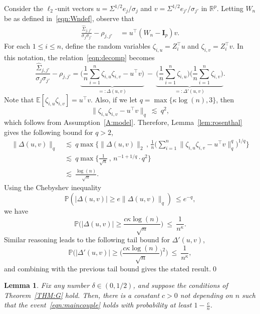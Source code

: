 \documentclass[aos,preprint]{imsart}
\numberwithin{equation}{section}
\theoremstyle{plain}
\newtheorem{lemma}{Lemma}[section]
\newcommand{\R}{\mathbb{R}}
\renewcommand{\hat}[1]{\widehat{#1}}
\renewcommand{\P}{\mathbb{P}}
\newcommand{\E}{\mathbb{E}}
\newcommand{\ttop}{^{\top}}
\newcommand{\ts}{\textstyle}
\newcommand{\1}{{\bf{1}}}
\newcommand{\0}{\mathbf{0}}
\begin{document}
\proof
 Consider the $\ell_2$-unit vectors $u=\Sigma^{1/2}e_j/\sigma_j$ and $v=\Sigma^{1/2}e_{j'}/\sigma_{j'}$  in $\R^p$.
Letting $W_n$ be as defined in~\eqref{eqn:Wndef}, observe that
\begin{equation}\label{eqn:decomp}
\begin{split}
\frac{\hat \Sigma_{j,j'}}{\sigma_j\sigma_{j'}} -\rho_{j,j'}
 & \ = u\ttop (W_n-\mathbf{I}_p)v.
%
%
\end{split}
\end{equation}
For each $1\leq i\leq n$, define the random variables $\zeta_{i,u}=Z_i\ttop u$ and $\zeta_{i,v}=Z_i\ttop v$. In this notation, the relation~\eqref{eqn:decomp} becomes
\begin{equation*}
\frac{\hat \Sigma_{j,j'}}{\sigma_j\sigma_{j'}} -\rho_{j,j'} =\underbrace{\Big(\ts\frac 1n \sum_{i=1}^n \zeta_{i,u}\zeta_{i,v}- u\ttop v\Big)}_{=:\Delta(u,v)} \ - \ \underbrace{\Big(\ts\frac 1n \sum_{i=1}^n \zeta_{i,u}\Big)\Big(\ts\frac 1n \sum_{i=1}^n \zeta_{i,v}\Big)}_{=:\Delta'(u,v)}.
\end{equation*}
Note that $\E[\zeta_{i,u}\zeta_{i,v}]=u\ttop v$.  Also, if we let $q=\max\{\kappa\log(n),3\}$, then
$$\|\zeta_{i,u}\zeta_{i,v}-u\ttop v\|_q \ \lesssim \ q^2,$$
which follows from Assumption~\ref{A:model}. Therefore, Lemma~\eqref{lem:rosenthal} gives the following bound for $q>2$,
\begin{equation}
\begin{split}
\|\Delta(u,v)\|_q & \ \lesssim  \ q \max\Big\{ \|\Delta(u,v)\|_2 \, , \, \ts\frac{1}{n}\big(\sum_{i=1}^n \|\zeta_{i,u}\zeta_{i,v}-u\ttop v\|_q^q\big)^{1/q}\Big\}\\[0.3cm]
%
& \ \lesssim \ q \max\Big\{\ts\frac{1}{\sqrt n} \, , \,  n^{-1+1/q}\cdot q^2\Big\}\\[0.3cm]
%
& \ \lesssim \ \ts\frac{\log(n)}{\sqrt n}.
\end{split}
\end{equation}
Using the Chebyshev inequality 
$$\P(|\Delta(u,v)|\geq e \|\Delta(u,v)\|_q) \ \leq e^{-q},$$
 we have
 $$\P\Big(|\Delta(u,v)|\geq \ts\frac{c\kappa\log(n)}{\sqrt n}\Big) \ \leq \ \ts\frac{1}{n^{\kappa}}.$$
Similar reasoning leads to the following tail bound for $\Delta'(u,v)$, 
  $$\P\bigg(|\Delta'(u,v)|\geq \big(\ts\frac{c\kappa\log(n)}{\sqrt n}\big)^2\bigg) \ \leq \ \ts\frac{1}{n^{\kappa}},$$
and combining with the previous tail bound gives the stated result.\qed
 
 
 


\begin{lemma}\label{lem:coupling}
Fix any number $\delta\in(0,1/2)$, and suppose the conditions of Theorem~\ref{THM:G} hold. Then, there is a constant $c>0$ not depending on $n$ such that the event~\eqref{eqn:maincouple} holds with probability at least $1-\frac cn$.
\end{lemma}
\end{document}
